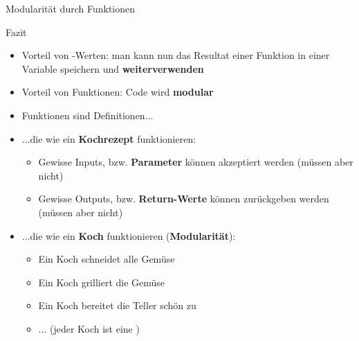\begin{frame}[fragile]{Modularität durch Funktionen}
\end{frame}

\begin{frame}{Fazit}
\begin{itemize}[<+->]
	\item {} Vorteil von -Werten: man kann nun das Resultat einer Funktion in einer Variable speichern und \textbf{weiterverwenden}
	\item {} Vorteil von Funktionen: Code wird \textbf{modular}
	\item Funktionen sind Definitionen...
	\item {} ...die wie ein \textbf{Kochrezept} funktionieren:
	\begin{itemize}
		\item Gewisse Inputs, bzw. \textbf{Parameter} können akzeptiert werden (müssen aber nicht)
		\item Gewisse Outputs, bzw. \textbf{Return-Werte }können zurückgeben werden (müssen aber nicht)
	\end{itemize}
	\item {} ...die wie ein \textbf{Koch} funktionieren (\textbf{Modularität}):
	\begin{itemize}
		\item Ein Koch schneidet alle Gemüse
		\item Ein Koch grilliert die Gemüse
		\item Ein Koch bereitet die Teller schön zu
		\item ... (jeder Koch ist eine )
	\end{itemize}
\end{itemize}
\end{frame}



